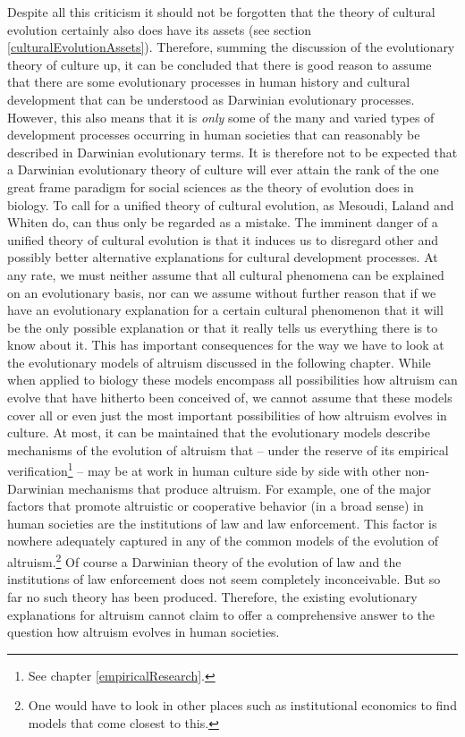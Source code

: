 Despite all this criticism it should not be forgotten that the theory
of cultural evolution certainly also does have its assets (see section
\ref{culturalEvolutionAssets}). Therefore, summing the discussion of
the evolutionary theory of culture up, it can be concluded that there
is good reason to assume that there are some evolutionary processes in
human history and cultural development that can be understood as
Darwinian evolutionary processes. However, this also means that it is
{\em only} some of the many and varied types of development processes
occurring in human societies that can reasonably be described in
Darwinian evolutionary terms. It is therefore not to be expected that
a Darwinian evolutionary theory of culture will ever attain the rank
of the one great frame paradigm for social sciences as the theory of
evolution does in biology. To call for a unified theory of cultural
evolution, as Mesoudi, Laland and Whiten do, can thus only be regarded
as a mistake. The imminent danger of a unified theory of cultural
evolution is that it induces us to disregard other and possibly better
alternative explanations for cultural development processes.  At any
rate, we must neither assume that all cultural phenomena can be
explained on an evolutionary basis, nor can we assume without further
reason that if we have an evolutionary explanation for a certain
cultural phenomenon that it will be the only possible explanation or
that it really tells us everything there is to know about it. This has
important consequences for the way we have to look at the evolutionary
models of altruism discussed in the following chapter.  While when
applied to biology these models encompass all possibilities how
altruism can evolve that have hitherto been conceived of, we cannot
assume that these models cover all or even just the most important
possibilities of how altruism evolves in culture.  At most, it can be
maintained that the evolutionary models describe mechanisms of the
evolution of altruism that -- under the reserve of its empirical
verification\footnote{See chapter \ref{empiricalResearch}.} -- may be
at work in human culture side by side with other non-Darwinian
mechanisms that produce altruism. For example, one of the major
factors that promote altruistic or cooperative behavior (in a broad
sense) in human societies are the institutions of law and law
enforcement.  This factor is nowhere adequately captured in any of the
common models of the evolution of altruism.\footnote{One would have to
  look in other places such as institutional economics to find models
  that come closest to this.} Of course a Darwinian theory of the
evolution of law and the institutions of law enforcement does not seem
completely inconceivable. But so far no such theory has been
produced. Therefore, the existing evolutionary explanations for
altruism cannot claim to offer a comprehensive answer to the question
how altruism evolves in human societies.

